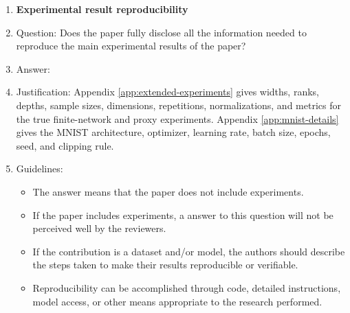 \documentclass{article}
\begin{document}
\begin{enumerate}[leftmargin=1.5em]
\item {\bf Experimental result reproducibility}
    \item[] Question: Does the paper fully disclose all the information needed to reproduce the main experimental results of the paper?
    \item[] Answer: \answerYes{}
    \item[] Justification: Appendix \ref{app:extended-experiments} gives widths, ranks, depths, sample sizes, dimensions, repetitions, normalizations, and metrics for the true finite-network and proxy experiments. Appendix \ref{app:mnist-details} gives the MNIST architecture, optimizer, learning rate, batch size, epochs, seed, and clipping rule.
    \item[] Guidelines:
    \begin{itemize}
        \item The answer \answerNA{} means that the paper does not include experiments.
        \item If the paper includes experiments, a \answerNo{} answer to this question will not be perceived well by the reviewers.
        \item If the contribution is a dataset and\slash or model, the authors should describe the steps taken to make their results reproducible or verifiable.
        \item Reproducibility can be accomplished through code, detailed instructions, model access, or other means appropriate to the research performed.
    \end{itemize}


\end{enumerate}
\end{document}

